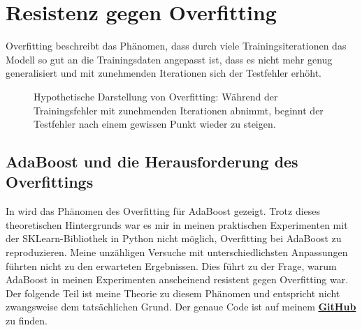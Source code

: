 \section{Resistenz gegen Overfitting}
Overfitting beschreibt das Phänomen, dass durch viele Trainingsiterationen das Modell so gut an die Trainingsdaten angepasst ist, dass es nicht mehr genug generalisiert und mit zunehmenden Iterationen sich der Testfehler erhöht.

\begin{figure}[H]
    \centering
    \caption{Hypothetische Darstellung von Overfitting: Während der Trainingsfehler mit zunehmenden Iterationen abnimmt, beginnt der Testfehler nach einem gewissen Punkt wieder zu steigen.}
\end{figure}


\subsection{AdaBoost und die Herausforderung des Overfittings}
In \textcite[Kapitel 1.2.3]{SchapireFreund2012} wird das Phänomen des Overfitting für AdaBoost gezeigt. Trotz dieses theoretischen Hintergrunds war es mir in meinen praktischen Experimenten mit der SKLearn-Bibliothek in Python nicht möglich, Overfitting bei AdaBoost zu reproduzieren. Meine unzähligen Versuche mit unterschiedlichsten Anpassungen führten nicht zu den erwarteten Ergebnissen. Dies führt zu der Frage, warum AdaBoost in meinen Experimenten anscheinend resistent gegen Overfitting war. Der folgende Teil ist meine Theorie zu diesem Phänomen und entspricht nicht zwangsweise dem tatsächlichen Grund. Der genaue Code ist auf meinem \textbf{\href{https://github.com/CodeLtDave/Boosting-Algorithms-ML-Seminararbeit/blob/main/python-env/ToleranceOverfittingAdaBoost.ipynb}{GitHub}} zu finden.

